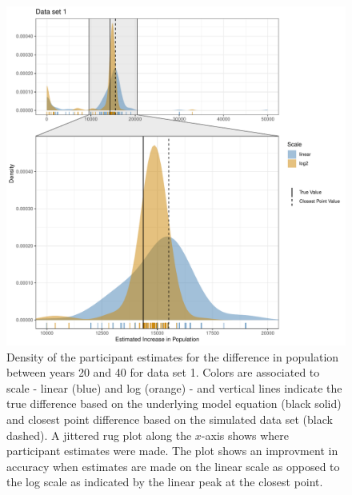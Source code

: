 \documentclass[print]{nuthesis}
\begin{document}
\begin{figure}[tbp]

{\centering \includegraphics[width=1\linewidth,]{thesis_files/figure-latex/qi1-density-1-1} 

}

\caption[Intermediate Q1 density (data set 1)]{Density of the participant estimates for the difference in population between years 20 and 40 for data set 1. Colors are associated to scale - linear (blue) and log (orange) - and vertical lines indicate the true difference based on the underlying model equation (black solid) and closest point difference based on the simulated data set (black dashed). A jittered rug plot along the $x$-axis shows where participant estimates were made. The plot shows an improvment in accuracy when estimates are made on the linear scale as opposed to the log scale as indicated by the linear peak at the closest point.}\label{fig:qi1-density-1}
\end{figure}
\end{document}
